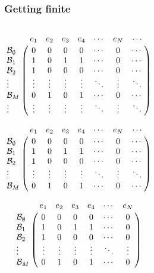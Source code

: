 \documentclass[aspectratio=169]{beamer}
\begin{document}
\begin{frame}
  \frametitle{Getting finite}
  \begin{columns}
    \begin{overprint}
      \[
        \bordermatrix{
          &e_1   &e_2   &e_3   &e_4   &\cdots&e_N &\cdots \cr
          \mathcal B_\emptyset &0     &0     &0     &0     &\cdots&0&\cdots       \cr
          \mathcal B_1     &1     &0     &1     &1     &\cdots&0&\cdots       \cr
          \mathcal B_2     &1     &0     &0     &0     &\cdots&0&\cdots       \cr
          \vdots  &\vdots&\vdots&\vdots&\vdots&\ddots&\vdots&\ddots  \cr
          \mathcal B_M&0     &1     &0     &1     &\cdots&0&\cdots \cr
          \vdots  &\vdots&\vdots&\vdots&\vdots&\ddots&\vdots&\ddots  \cr
        }
      \]

      \[
        \bordermatrix{
          &e_1   &e_2   &e_3   &e_4   &\cdots&e_N &\cdots \cr
          \mathcal B_\emptyset &0     &0     &0     &0     &\cdots&0&\cdots       \cr
          \mathcal B_1     &1     &0     &1     &1     &\cdots&0&\cdots       \cr
          \mathcal B_2     &1     &0     &0     &0     &\cdots&0&\cdots       \cr
          \vdots  &\vdots&\vdots&\vdots&\vdots&\ddots&\vdots&\ddots  \cr
          \mathcal B_M&0     &1     &0     &1     &\cdots&0&\cdots \cr
        }
      \]

      \[
        \bordermatrix{
          &e_1   &e_2   &e_3   &e_4   &\cdots&e_N \cr
          \mathcal B_\emptyset &0     &0     &0     &0     &\cdots&0\cr
          \mathcal B_1     &1     &0     &1     &1     &\cdots&0\cr
          \mathcal B_2     &1     &0     &0     &0     &\cdots&0\cr
          \vdots  &\vdots&\vdots&\vdots&\vdots&\ddots&\vdots\cr
          \mathcal B_M&0     &1     &0     &1     &\cdots&0\cr
        }
      \]


\end{overprint}
\end{columns}
\end{frame}
\end{document}
